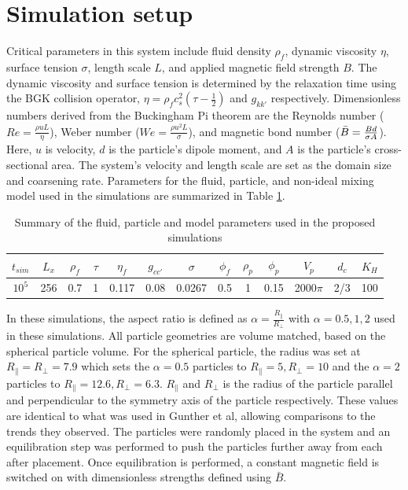 \section{Simulation setup}
\label{section:sim_setup}

Critical parameters in this system include fluid density $\rho_f$, dynamic viscosity $\eta$, surface tension $\sigma$, 
length scale $L$, and applied magnetic field strength $B$. The dynamic viscosity and surface tension is determined 
by the relaxation time using the BGK collision operator, $\eta = \rho_f c_s^2(\tau - \frac{1}{2})$ and $g_{kk'}$ 
respectively. Dimensionless numbers derived from the Buckingham Pi theorem are the Reynolds number
($Re = \frac{\rho u L}{\eta}$), Weber number ($We = \frac{\rho u^2 L}{\sigma}$), and magnetic bond number 
($\Bar{B} = \frac{Bd}{\sigma A}$). Here, $u$ is velocity, $d$ is the particle's dipole moment, and $A$ is the 
particle's cross-sectional area. The system's velocity and length scale are set as the domain size and coarsening rate. 
Parameters for the fluid, particle, and non-ideal mixing model used in the simulations are summarized in Table 
\ref{table:model_params}.

\begin{table}[h!]
\centering
\begin{tabular}{||c c c c c c c c c c c c c||} 
 \hline
 $t_{sim}$ & $L_x$ & $\rho_f$ & $\tau$ & $\eta_f$ & $g_{cc'}$ & $\sigma$ & $\phi_f$ & $\rho_p$ & $\phi_p$ & $V_p$ & $d_c$ & $K_H$ \\ [0.5ex] 
 \hline\hline
 $10^5$ & 256 & 0.7 & 1 & 0.117 & 0.08 & 0.0267 & 0.5 & 1 & 0.15 & 2000$\pi$ & 2/3 & 100\\ [1ex] 
 \hline
\end{tabular}
\caption{Summary of the fluid, particle and model parameters used in the proposed simulations}
\label{table:model_params}
\end{table}

In these simulations, the aspect ratio is defined as $\alpha = \frac{R_{\parallel}}{R_{\perp}}$ with $\alpha = 0.5, 1, 2$ 
used in these simulations. All particle geometries are volume matched, based on the spherical particle volume. For the 
spherical particle, the radius was set at $R_{\parallel} = R_{\perp} = 7.9$ which sets the $\alpha = 0.5$ particles to 
$R_{\parallel} = 5, R_{\perp} = 10$ and the $\alpha = 2$ particles to $R_{\parallel} = 12.6, R_{\perp} = 6.3$. 
$R_{\parallel}$ and $R_{\perp}$ is the radius of the particle parallel and perpendicular to the symmetry axis of 
the particle respectively. These values are identical to what was used in Gunther et al, allowing comparisons to the 
trends they observed. \cite{gunther_timescales_2014} The particles were randomly placed in the system and an equilibration
step was performed to push the particles further away from each after placement. Once equilibration is performed, a 
constant magnetic field is switched on with dimensionless strengths defined using $\bar{B}$.

